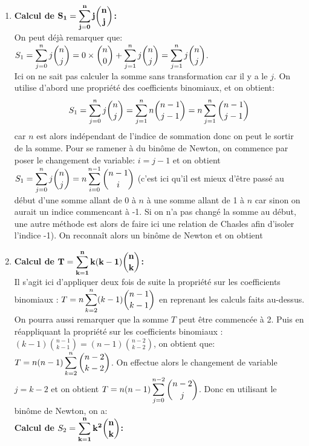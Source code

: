 \documentclass[a4paper, 11pt,reqno]{article}
\begin{document}
\begin{correction}   \;
\begin{enumerate}
\item \textbf{Calcul de $\mathbf{S_1=\displaystyle \sum\limits_{j=0}^n j\displaystyle \binom{n}{j}}$:}\\
\noindent On peut d\'ej\`{a} remarquer que: $\displaystyle S_1= \sum\limits_{j=0}^n j\binom{n}{j}=0\times \binom{n}{0}+\displaystyle \sum\limits_{j=1}^n j\binom{n}{j}=\displaystyle \sum\limits_{j=1}^n j\binom{n}{j}$. \\
Ici on ne sait pas calculer la somme sans transformation car il y a le $j$. On utilise d'abord une propri\'et\'e des coefficients binomiaux, et on obtient: 
$$S_1=\displaystyle \sum\limits_{j=0}^n j\displaystyle \binom{n}{j}=\displaystyle \sum\limits_{j=1}^n n\binom{n-1}{j-1}=n\displaystyle \sum\limits_{j=1}^n \binom{n-1}{j-1}$$ 
car $n$ est alors ind\'ependant de l'indice de sommation donc on peut le sortir de la somme. Pour se ramener \`{a} du bin\^{o}me de Newton, on commence par poser le changement de variable: $i=j-1$ et on obtient $\displaystyle S_1=\sum\limits_{j=0}^n j\binom{n}{j}=n \displaystyle \sum\limits_{i=0}^{n-1} \binom{n-1}{i}$ (c'est ici qu'il est mieux d'\^{e}tre pass\'e au d\'ebut d'une somme allant de 0 \`{a} $n$ \`{a} une somme allant de 1 \`{a} $n$ car sinon on aurait un indice commencant \`{a} -1. Si on n'a pas chang\'e la somme au d\'ebut, une autre m\'ethode est alors de faire ici une relation de Chasles afin d'isoler l'indice -1). On reconna\^{i}t alors un bin\^{o}me de Newton et on obtient 
\item   \textbf{Calcul de $\mathbf{T=\displaystyle \sum\limits_{k=1}^n k(k-1)\displaystyle \binom{n}{k}}$:}\\
\noindent Il s'agit ici d'appliquer deux fois de suite la propri\'et\'e sur les coefficients binomiaux : $T=n\displaystyle \sum\limits_{k=2}^{n} (k-1)\binom{n-1}{k-1}$ en reprenant les calculs faits au-dessus. On pourra aussi remarquer que la somme $T$ peut \^{e}tre commenc\'ee \`{a} 2. Puis en r\'eappliquant la propri\'et\'e sur les coefficients binomiaux : $(k-1)\binom{n-1}{k-1}=(n-1)\binom{n-2}{k-2}$, on obtient que: $T=n(n-1)\displaystyle \sum\limits_{k=2}^{n} \binom{n-2}{k-2}$. On effectue alors le changement de variable $j=k-2$ et on obtient $T=n(n-1)\displaystyle \sum\limits_{j=0}^{n-2} \binom{n-2}{j}$. Donc en utilisant le bin\^{o}me de Newton, on a: \\
\noindent \textbf{Calcul de $S_2=\mathbf{\displaystyle \sum\limits_{k=1}^n k^2\displaystyle \binom{n}{k}}$:}\\

\end{enumerate}
\end{correction}
\end{document}
